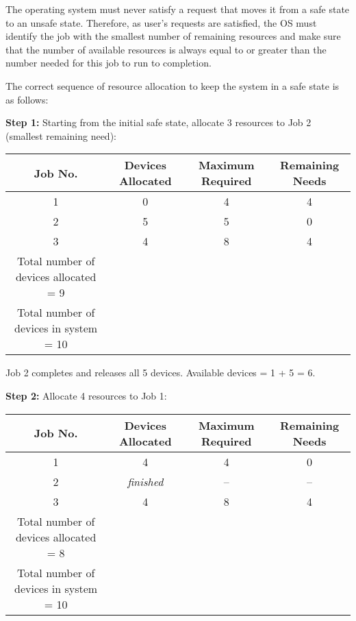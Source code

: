 \documentclass[12pt letter]{report}
\begin{document}
{  The operating system must never satisfy a request that moves it
  from a safe state to an unsafe state. Therefore, as user's requests
  are satisfied, the OS must identify the job with the smallest number
  of remaining resources and make sure that the number of available
  resources is always equal to or greater than the number needed for
  this job to run to completion.

  The correct sequence of resource allocation to keep the system in a safe
  state is as follows:

  \textbf{Step 1:} Starting from the initial safe state, allocate 3
  resources to Job 2 (smallest remaining need):
  \begin{table}[H]
    \begin{center}
      \begin{tabular}{|c c c c|}
        \hline
        Job No. & Devices Allocated & Maximum Required & Remaining
        Needs \\ [0.5ex]
        \hline
        \hline
        1 & 0 & 4 & 4 \\
        2 & 5 & 5 & 0 \\
        3 & 4 & 8 & 4 \\
        \hline
        Total number of devices allocated = 9 & & & \\
        \hline
        Total number of devices in system = 10 & & & \\
        \hline
      \end{tabular}
    \end{center}
  \end{table}

  Job 2 completes and releases all 5 devices. Available devices = 1 + 5 = 6.

  \textbf{Step 2:} Allocate 4 resources to Job 1:
  \begin{table}[H]
    \begin{center}
      \begin{tabular}{|c c c c|}
        \hline
        Job No. & Devices Allocated & Maximum Required & Remaining
        Needs \\ [0.5ex]
        \hline
        \hline
        1 & 4 & 4 & 0 \\
        2 & \textit{finished} & -- & -- \\
        3 & 4 & 8 & 4 \\
        \hline
        Total number of devices allocated = 8 & & & \\
        \hline
        Total number of devices in system = 10 & & & \\
        \hline
      \end{tabular}
    \end{center}
  \end{table}

}
\end{document}
